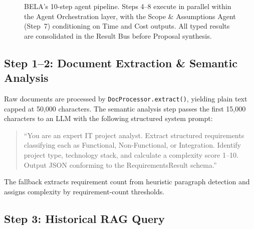 \documentclass[10pt,twocolumn]{article}
\newcommand{\code}[1]{\texttt{\small #1}}
\begin{document}
\begin{figure}[H]
\caption{BELA's 10-step agent pipeline. Steps 4–8 execute in parallel
within the Agent Orchestration layer, with the Scope \& Assumptions Agent
(Step~7) conditioning on Time and Cost outputs. All typed results are
consolidated in the Result Bus before Proposal synthesis.}
\label{fig:pipeline}
\end{figure}

\subsection{Step 1–2: Document Extraction \& Semantic Analysis}

Raw documents are processed by \code{DocProcessor.extract()}, yielding
plain text capped at 50,000 characters. The semantic analysis step passes
the first 15,000 characters to an LLM with the following structured system prompt:

\begin{quote}
\small\ttfamily
``You are an expert IT project analyst. Extract structured requirements
classifying each as Functional, Non-Functional, or Integration. Identify
project type, technology stack, and calculate a complexity score 1–10.
Output JSON conforming to the RequirementsResult schema.''
\end{quote}

The fallback extracts requirement count from heuristic paragraph detection
and assigns complexity by requirement-count thresholds.

\subsection{Step 3: Historical RAG Query}
\end{document}
